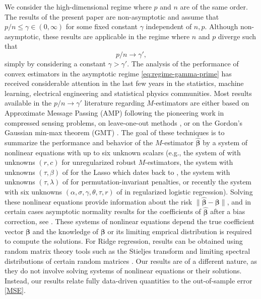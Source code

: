 \documentclass[11pt]{amsart}
\numberwithin{equation}{section}
\numberwithin{equation}{section}
\def\mathbold{\boldsymbol} %
\def\bbeta{\mathbold{\beta}}\def\betahat{\widehat{\beta}}\def\hbeta{\widehat{\beta}}
\def\hbbeta{{{\widehat{\bbeta}}}}
\begin{document}
We consider the high-dimensional regime where $p$ and
$n$ are of the same order. The results of the present paper
are non-asymptotic and assume that $p/n \le \gamma\in(0,\infty)$
for some fixed constant $\gamma$ independent of $n,p$.
Although non-asymptotic, these results are applicable
in the regime where $n$ and $p$ diverge such that 
\begin{equation}
    \label{eq:regime-gamma-prime}
    p/n\to \gamma'
    ,
\end{equation}
simply by considering a constant $\gamma>\gamma'$.
The analysis of the performance of convex estimators
in the asymptotic regime \eqref{eq:regime-gamma-prime}
has received considerable attention in the last few years
in the statistics, machine learning, electrical engineering
and statistical physics communities.
Most results available in the $p/n\to\gamma'$ literature regarding
$M$-estimators are
either based on
Approximate Message Passing (AMP) \cite{bayati2012lasso,donoho2016high,bradic2015robustness,wang2017bridge,celentano2019fundamental,gerbelot2020asymptotic}
following the pioneering work \cite{donoho2009message}
in compressed sensing problems,
on leave-one-out methods \cite{el_karoui2013robust,bean2013optimal,karoui2013asymptotic,el_karoui2018impact},
or on the Gordon's Gaussian min-max theorem (GMT) 
\cite{stojnic2013framework,
thrampoulidis2015lasso,
thrampoulidis2018precise,miolane2018distribution}.
The goal of these techniques is to
summarize the performance and behavior of the $M$-estimator $\hbbeta$
by a system of nonlinear equations with up to six unknown scalars
(e.g., the system of \cite{el_karoui2013robust} with unknowns
$(r,c)$ for unregularized robust $M$-estimators,
the system with unknowns $(\tau,\beta)$ of \cite[Proposition 3.1]{miolane2018distribution}
for the Lasso which dates back to \cite{bayati2012lasso},
the system with unknowns $(\tau,\lambda)$ of \cite[Section 4]{celentano2019fundamental} for permutation-invariant penalties,
or recently the system with six unknowns
$(\alpha,\sigma,\gamma,\theta,\tau,r)$
of
\cite{salehi2019impact} in regularized logistic regression).
Solving these nonlinear equations provide information about the risk
$\|\hbbeta-\bbeta\|$,
and in certain cases asymptotic normality results for the coefficients of $\hbbeta$
after a bias correction, see
\cite[e.g., Proposition B.3(iii)]{celentano2019fundamental}.
These systems of nonlinear equations depend the true coefficient vector
$\bbeta$ and the knowledge of $\bbeta$ or its limiting emprical
distribution is required to compute
the solutions. 
For Ridge regression, results can be obtained
using random matrix theory tools such as the Stieljes transform
and limiting spectral distributions of certain
random matrices
\cite{dicker2016ridge,dobriban2018high}.
Our results are of a different nature, as they do not involve solving systems
of nonlinear equations or their solutions.
Instead, our results relate fully data-driven quantities
to the out-of-sample error \eqref{MSE}. 
\end{document}
